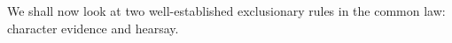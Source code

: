\documentclass[10pt]{article}
\begin{document}
%
%

We shall now look at two well-established 
exclusionary rules in the common law: 
character evidence and hearsay. 

%
%
\end{document}

